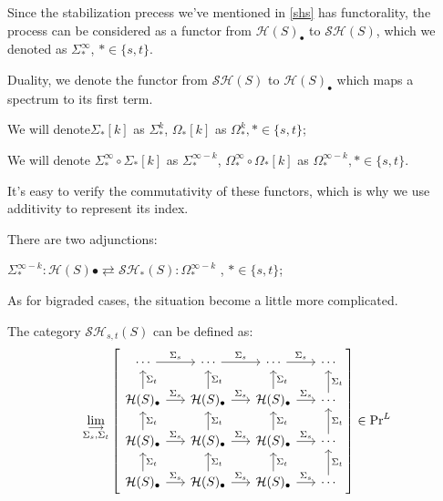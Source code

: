 \begin{remark}
    
Since the stabilization precess we've mentioned in \ref{shs} has functorality, the process can be considered as a functor from $\mathcal{H}(S)_\bullet$ to $\mathcal{SH}(S)$, which we denoted as $\Sigma_*^\infty$, $*\in\{s,t\}$.

Duality, we denote the functor from $\mathcal{SH}(S)$  to $\mathcal{H}(S)_\bullet$ which maps a spectrum to its first term.
\end{remark}

\begin{remark}
    We will denote$\Sigma_*[k]$  as $\Sigma_*^k$, $\Omega_*[k]$ as $\Omega_*^k,*\in\{s,t\}$;

    We will denote $\Sigma_*^\infty\circ\Sigma_*[k]$  as $\Sigma_*^{\infty-k}$, $\Omega_*^\infty\circ\Omega_*[k]$  as $\Omega_*^{\infty-k},*\in\{s,t\}$.

    It's easy to verify the commutativity of these functors, which is why we use additivity to represent its index.
\end{remark}

\begin{proposition}
    There are two adjunctions:

$    \Sigma_*^{\infty-k}: \mathcal{H}(S)\bullet \rightleftarrows \mathcal{SH}_*(S): \Omega_*^{\infty-k}$ , $*\in \{s,t\}$;
\end{proposition}

As for bigraded cases, the situation become a little more complicated.

\begin{definition}
The category $\mathcal{SH}_{s,t}(S)$ can be defined as:
\[
\mathop{\mathrm{lim}}\limits_{\substack{\longrightarrow \\ \Sigma_s, \Sigma_t}} 
\left[
\begin{tikzcd}[
  row sep=1.5em, 
  column sep=1.5em,
  cells={nodes={minimum width=2em}} %
]
\cdots \arrow[r, "\Sigma_s"] & \cdots \arrow[r, "\Sigma_s"] & \cdots \arrow[r, "\Sigma_s"] & \cdots \\
\mathcal{H}(S)_\bullet \arrow[r, "\Sigma_s"] \arrow[u, "\Sigma_t"'] & 
\mathcal{H}(S)_\bullet \arrow[r, "\Sigma_s"] \arrow[u, "\Sigma_t"'] & 
\mathcal{H}(S)_\bullet \arrow[r, "\Sigma_s"] \arrow[u, "\Sigma_t"'] & 
\cdots \arrow[u, "\Sigma_t"'] \\
\mathcal{H}(S)_\bullet \arrow[r, "\Sigma_s"] \arrow[u, "\Sigma_t"'] & 
\mathcal{H}(S)_\bullet \arrow[r, "\Sigma_s"] \arrow[u, "\Sigma_t"'] & 
\mathcal{H}(S)_\bullet \arrow[r, "\Sigma_s"] \arrow[u, "\Sigma_t"'] & 
\cdots \arrow[u, "\Sigma_t"'] \\
\mathcal{H}(S)_\bullet \arrow[r, "\Sigma_s"] \arrow[u, "\Sigma_t"'] & 
\mathcal{H}(S)_\bullet \arrow[r, "\Sigma_s"] \arrow[u, "\Sigma_t"'] & 
\mathcal{H}(S)_\bullet \arrow[r, "\Sigma_s"] \arrow[u, "\Sigma_t"'] & 
\cdots \arrow[u, "\Sigma_t"']
\end{tikzcd}
\right]\in \text{Pr}^L

\]

\end{definition}

